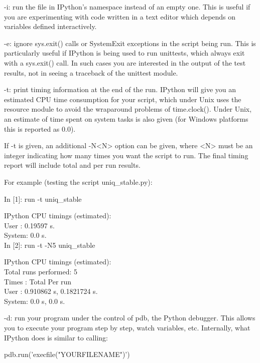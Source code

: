         -i: run the file in IPython's namespace instead of an empty one. This
        is useful if you are experimenting with code written in a text editor
        which depends on variables defined interactively.

        -e: ignore sys.exit() calls or SystemExit exceptions in the script
        being run.  This is particularly useful if IPython is being used to
        run unittests, which always exit with a sys.exit() call.  In such
        cases you are interested in the output of the test results, not in
        seeing a traceback of the unittest module.

        -t: print timing information at the end of the run.  IPython will give
        you an estimated CPU time consumption for your script, which under
        Unix uses the resource module to avoid the wraparound problems of
        time.clock().  Under Unix, an estimate of time spent on system tasks
        is also given (for Windows platforms this is reported as 0.0).

        If -t is given, an additional -N<N> option can be given, where <N>
        must be an integer indicating how many times you want the script to
        run.  The final timing report will include total and per run results.

        For example (testing the script uniq\_stable.py):

            In [1]: run -t uniq\_stable

            IPython CPU timings (estimated):\\
              User  :    0.19597 s.\\
              System:        0.0 s.\\

            In [2]: run -t -N5 uniq\_stable

            IPython CPU timings (estimated):\\
            Total runs performed: 5\\
              Times :      Total       Per run\\
              User  :   0.910862 s,  0.1821724 s.\\
              System:        0.0 s,        0.0 s.

        -d: run your program under the control of pdb, the Python debugger.
        This allows you to execute your program step by step, watch variables,
        etc.  Internally, what IPython does is similar to calling:
        
          pdb.run('execfile("YOURFILENAME")')

